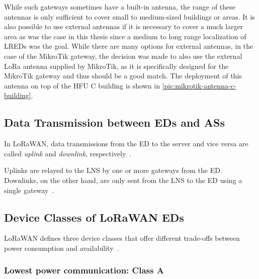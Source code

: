 While such gateways sometimes have a built-in antenna, the range of these antennas is only sufficient to cover small to medium-sized buildings or areas.
It is also possible to use external antennas if it is necessary to cover a much larger area as was the case in this thesis since a medium to long range localization of \aclp{LRED} was the goal.
While there are many options for external antennas, in the case of the MikroTik gateway, the decision was made to also use the external \ac{LoRa} antenna supplied by MikroTik, as it is specifically designed for the MikroTik gateway and thus should be a good match.
The deployment of this antenna on top of the \ac{HFU} C building is shown in \cref{pic:mikrotik-antenna-c-building}.

\subsection{Data Transmission between \aclp{ED} and \aclp{AS}}

In LoRaWAN, data transmissions from the \acl{ED} to the server and vice versa are called \emph{uplink} and \emph{downlink}, respectively~\cite[p. 12]{lora_alliance_inc_lorawan_specification_2017}.

Uplinks are relayed to the \ac{LNS} by one or more gateways from the \acl{ED}.
Downlinks, on the other hand, are only sent from the \ac{LNS} to the \acl{ED} using a single gateway~\cite[p. 12]{lora_alliance_inc_lorawan_specification_2017}.

\subsection{Device Classes of \acs{LoRaWAN} \aclp{ED}}\label{sec:device-classes}

\ac{LoRaWAN} defines three device classes that offer different trade-offs between power consumption and availability~\cite[p. 10]{lora_alliance_inc_lorawan_specification_2017}.

\subsubsection{Lowest power communication: Class A}

